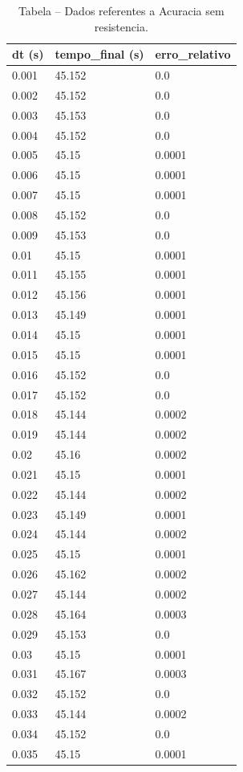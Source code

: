 \begin{table}[H]
\centering
\caption{Tabela – Dados referentes a Acuracia sem resistencia.}
\label{tab:acuracia_sem_resistencia}
\begin{tabular}{lll}
\toprule
dt (s) & tempo\_final (s) & erro\_relativo \\
\midrule
0.001 & 45.152 & 0.0 \\
0.002 & 45.152 & 0.0 \\
0.003 & 45.153 & 0.0 \\
0.004 & 45.152 & 0.0 \\
0.005 & 45.15 & 0.0001 \\
0.006 & 45.15 & 0.0001 \\
0.007 & 45.15 & 0.0001 \\
0.008 & 45.152 & 0.0 \\
0.009 & 45.153 & 0.0 \\
0.01 & 45.15 & 0.0001 \\
0.011 & 45.155 & 0.0001 \\
0.012 & 45.156 & 0.0001 \\
0.013 & 45.149 & 0.0001 \\
0.014 & 45.15 & 0.0001 \\
0.015 & 45.15 & 0.0001 \\
0.016 & 45.152 & 0.0 \\
0.017 & 45.152 & 0.0 \\
0.018 & 45.144 & 0.0002 \\
0.019 & 45.144 & 0.0002 \\
0.02 & 45.16 & 0.0002 \\
0.021 & 45.15 & 0.0001 \\
0.022 & 45.144 & 0.0002 \\
0.023 & 45.149 & 0.0001 \\
0.024 & 45.144 & 0.0002 \\
0.025 & 45.15 & 0.0001 \\
0.026 & 45.162 & 0.0002 \\
0.027 & 45.144 & 0.0002 \\
0.028 & 45.164 & 0.0003 \\
0.029 & 45.153 & 0.0 \\
0.03 & 45.15 & 0.0001 \\
0.031 & 45.167 & 0.0003 \\
0.032 & 45.152 & 0.0 \\
0.033 & 45.144 & 0.0002 \\
0.034 & 45.152 & 0.0 \\
0.035 & 45.15 & 0.0001 \\

\end{tabular}
\end{table}

